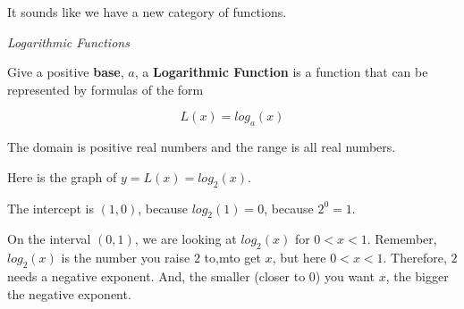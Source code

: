 \documentclass{ximera}
\begin{document}
It sounds like we have a new category of functions.




\begin{definition} \textit{Logarithmic Functions}

Give a positive \textbf{base}, $a$, a \textbf{Logarithmic Function} is a function that can be represented by formulas of the form

\[     L(x) =    log_a(x)            \]

The domain is positive real numbers and the range is all real numbers.

\end{definition}








\begin{example}

Here is the graph of $y = L(x) = log_2(x)$.

\begin{image}
\end{image}


The intercept is $(1,0)$, because $log_2(1) = 0$, because $2^0 = 1$.

On the interval $(0,1)$, we are looking at $log_2(x)$ for $0<x<1$.  Remember, $log_2(x)$ is the number you raise $2$ to,mto get $x$, but here $0<x<1$.  Therefore, $2$ needs a negative exponent.  And, the smaller (closer to $0$) you want $x$, the bigger the negative exponent.





\end{example}
\end{document}
